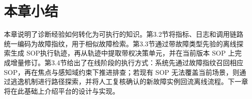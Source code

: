 
\section{本章小结}

本章说明了诊断经验如何转化为可执行的知识。第3.2节将指标、日志和调用链路统一编码为故障指纹，用于相似故障检索。第3.3节通过带故障类型先验的离线探索生成 SOP执行轨迹，再从轨迹中提取带权决策单元，并在当前版本 SOP 上完成增量修订。第3.4节给出了在线阶段的执行方式：系统先通过故障指纹召回相应 SOP，再在焦点与感知域约束下推进排查；若现有 SOP 无法覆盖当前场景，则通过逃逸机制进行路径探索，并将人工复核确认的新故障实例回流离线流程。下一章将在此基础上介绍平台的设计与实现。
